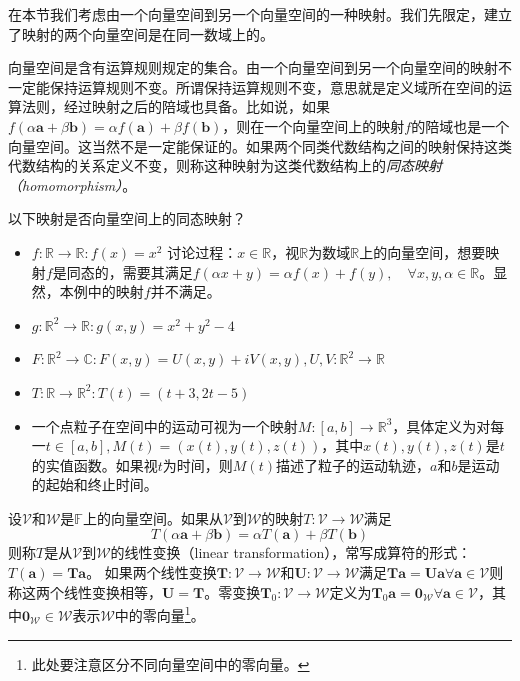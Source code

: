 \documentclass[main.tex]{subfiles}
\begin{document}
在本节我们考虑由一个向量空间到另一个向量空间的一种映射。我们先限定，建立了映射的两个向量空间是在同一数域上的。

向量空间是含有运算规则规定的集合。由一个向量空间到另一个向量空间的映射不一定能保持运算规则不变。所谓保持运算规则不变，意思就是定义域所在空间的运算法则，经过映射之后的陪域也具备。比如说，如果$f\left(\alpha\mathbf{a}+\beta\mathbf{b}\right)=\alpha f\left(\mathbf{a}\right)+\beta f\left(\mathbf{b}\right)$，则在一个向量空间上的映射$f$的陪域也是一个向量空间。这当然不是一定能保证的。如果两个同类代数结构之间的映射保持这类代数结构的关系定义不变，则称这种映射为这类代数结构上的\emph{同态映射（homomorphism）}。
\begin{example}
    以下映射是否向量空间上的同态映射？
    \begin{itemize}
        \item $f:\mathbb{R}\rightarrow\mathbb{R}:f\left(x\right)=x^2$
              讨论过程：$x\in\mathbb{R}$，视$\mathbb{R}$为数域$\mathbb{R}$上的向量空间，想要映射$f$是同态的，需要其满足$f\left(\alpha x+ y\right)=\alpha f\left(x\right)+f\left(y\right),\quad\forall x,y,\alpha\in\mathbb{R}$。显然，本例中的映射$f$并不满足。
        \item $g:\mathbb{R}^2\rightarrow\mathbb{R}:g\left(x,y\right)=x^2+y^2-4$
        \item $F:\mathbb{R}^2\rightarrow\mathbb{C}:F\left(x,y\right)=U\left(x,y\right)+iV\left(x,y\right),U,V:\mathbb{R}^2\rightarrow\mathbb{R}$
        \item $T:\mathbb{R}\rightarrow\mathbb{R}^2:T\left(t\right)=\left(t+3,2t-5\right)$
        \item 一个点粒子在空间中的运动可视为一个映射$M:\left[a,b\right]\rightarrow\mathbb{R}^3$，具体定义为对每一$t\in\left[a,b\right],M\left(t\right)=\left(x\left(t\right),y\left(t\right),z\left(t\right)\right)$，其中$x\left(t\right),y\left(t\right),z\left(t\right)$是$t$的实值函数。如果视$t$为时间，则$M\left(t\right)$描述了粒子的运动轨迹，$a$和$b$是运动的起始和终止时间。
    \end{itemize}
\end{example}

\begin{definition}[线性变换]\label{def:II.2.11}
    设$\mathcal{V}$和$\mathcal{W}$是$\mathbb{F}$上的向量空间。如果从$\mathcal{V}$到$\mathcal{W}$的映射$T:\mathcal{V}\rightarrow\mathcal{W}$满足
    \[T\left(\alpha\mathbf{a}+\beta\mathbf{b}\right)=\alpha T\left(\mathbf{a}\right)+\beta T\left(\mathbf{b}\right)\]
    则称$T$是从$\mathcal{V}$到$\mathcal{W}$的线性变换（linear transformation），常写成算符的形式：$T\left(\mathbf{a}\right)=\mathbf{Ta}$。
    如果两个线性变换$\mathbf{T}:\mathcal{V}\rightarrow\mathcal{W}$和$\mathbf{U}:\mathcal{V}\rightarrow\mathcal{W}$满足$\mathbf{Ta}=\mathbf{Ua}\forall\mathbf{a}\in\mathcal{V}$则称这两个线性变换相等，$\mathbf{U}=\mathbf{T}$。零变换$\mathbf{T}_0:\mathcal{V}\rightarrow\mathcal{W}$定义为$\mathbf{T}_0\mathbf{a}=\mathbf{0}_\mathcal{W}\forall\mathbf{a}\in\mathcal{V}$，其中$\mathbf{0}_\mathcal{W}\in\mathcal{W}$表示$\mathcal{W}$中的零向量\footnote{此处要注意区分不同向量空间中的零向量。}。
\end{definition}
\end{document}
